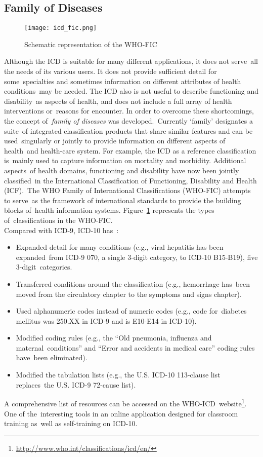   \subsection{Family of Diseases}
  \begin{figure}[!ht]
    \centering
    \texttt{[image: icd\_fic.png]}
    \caption{Schematic representation of the WHO-FIC\
    \citep{icd10_instruction_manual_-_volume_2_international_2010}}
    \label{fig:icd_fic}
  \end{figure}
  Although the ICD is suitable for many different applications, it does not serve\
  all the needs of its various users. It does not provide sufficient detail for some\
  specialties and sometimes information on different attributes of health conditions\
  may be needed. The ICD also is not useful to describe functioning and disability\
  as aspects of health, and does not include a full array of health interventions or\
  reasons for encounter. In order to overcome these shortcomings, the concept of\
  \emph{family of diseases} was developed.\
  Currently `family' designates a suite\
  of integrated classification products that share similar features and can be used\
  singularly or jointly to provide information on different aspects of health\
  and health-care system. For example, the ICD as a reference classification is\
  mainly used to capture information on mortality and morbidity. Additional aspects\
  of health domains, functioning and disability have now been jointly classified\
  in the International Classification of Functioning, Disability and Health (ICF).\
  The WHO Family of International Classifications (WHO-FIC) attempts to serve\
  as the framework of international standards to provide the building blocks of\
  health information systems. Figure~\ref{fig:icd_fic} represents the types of\
  classifications in the WHO-FIC.\\
  
  \noindent Compared with ICD-9, ICD-10 has~\citep{disantostefano_international_2009}:
  \begin{itemize}
    \itemsep0ex
    \item Expanded detail for many conditions (e.g., viral hepatitis has been expanded\
    from ICD-9 070, a single 3-digit category, to ICD-10 B15-B19), five 3-digit\
    categories.\
    \item Transferred conditions around the classification (e.g., hemorrhage has\
    been moved from the circulatory chapter to the symptoms and signs chapter).\
    \item Used alphanumeric codes instead of numeric codes (e.g., code for\
    diabetes mellitus was 250.XX in ICD-9 and is E10-E14 in ICD-10).
    \item Modified coding rules (e.g., the ``Old pneumonia, influenza and maternal\
    conditions'' and ``Error and accidents in medical care'' coding rules have\
    been eliminated).\
    \item Modified the tabulation lists (e.g., the U.S. ICD-10 113-clause list replaces\
    the U.S. ICD-9 72-cause list).
  \end{itemize}
  
  \noindent  A comprehensive list of resources can be accessed on the WHO-ICD\
  website\footnote{\url{http://www.who.int/classifications/icd/en/}}. One of the\
  interesting tools in an online application designed for classroom training as\
  well as self-training on ICD-10.
  
  